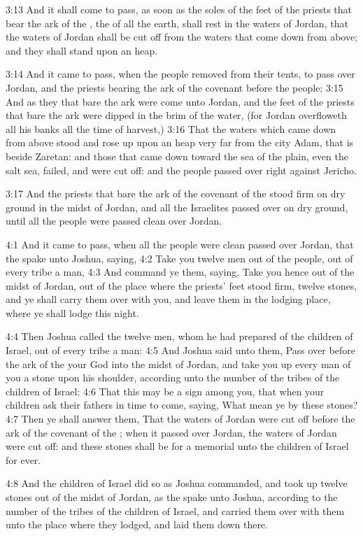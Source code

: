 3:13 And it shall come to pass, as soon as the soles of the feet of the priests that bear the ark of the \LORD, the \LORD of all the earth, shall rest in the waters of Jordan, that the waters of Jordan shall be cut off from the waters that come down from above; and they shall stand upon an heap.

3:14 And it came to pass, when the people removed from their tents, to pass over Jordan, and the priests bearing the ark of the covenant before the people; 3:15 And as they that bare the ark were come unto Jordan, and the feet of the priests that bare the ark were dipped in the brim of the water, (for Jordan overfloweth all his banks all the time of harvest,) 3:16 That the waters which came down from above stood and rose up upon an heap very far from the city Adam, that is beside Zaretan: and those that came down toward the sea of the plain, even the salt sea, failed, and were cut off: and the people passed over right against Jericho.

3:17 And the priests that bare the ark of the covenant of the \LORD stood firm on dry ground in the midst of Jordan, and all the Israelites passed over on dry ground, until all the people were passed clean over Jordan.

4:1 And it came to pass, when all the people were clean passed over Jordan, that the \LORD spake unto Joshua, saying, 4:2 Take you twelve men out of the people, out of every tribe a man, 4:3 And command ye them, saying, Take you hence out of the midst of Jordan, out of the place where the priests' feet stood firm, twelve stones, and ye shall carry them over with you, and leave them in the lodging place, where ye shall lodge this night.

4:4 Then Joshua called the twelve men, whom he had prepared of the children of Israel, out of every tribe a man: 4:5 And Joshua said unto them, Pass over before the ark of the \LORD your God into the midst of Jordan, and take you up every man of you a stone upon his shoulder, according unto the number of the tribes of the children of Israel: 4:6 That this may be a sign among you, that when your children ask their fathers in time to come, saying, What mean ye by these stones?  4:7 Then ye shall answer them, That the waters of Jordan were cut off before the ark of the covenant of the \LORD; when it passed over Jordan, the waters of Jordan were cut off: and these stones shall be for a memorial unto the children of Israel for ever.

4:8 And the children of Israel did so as Joshua commanded, and took up twelve stones out of the midst of Jordan, as the \LORD spake unto Joshua, according to the number of the tribes of the children of Israel, and carried them over with them unto the place where they lodged, and laid them down there.

